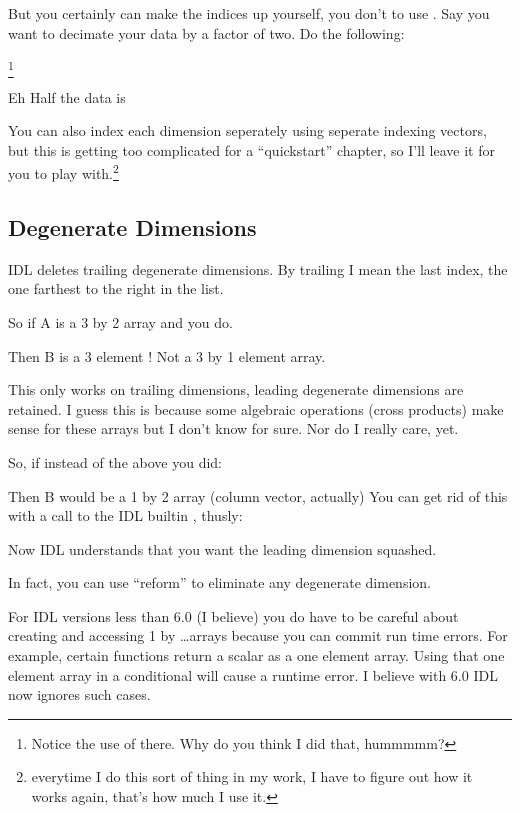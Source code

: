   But you certainly can make the indices up yourself, you don't
   to use . Say you want to decimate your data by a factor of
  two. Do the following:

  \footnote{Notice the use
  of  there. Why do you think I did that, hummmmm?}

  Eh  Half the data is 

  You can also index each dimension seperately using seperate indexing
  vectors, but this is getting too complicated for a ``quickstart''
  chapter, so I'll leave it for you to play with.\footnote{everytime I
  do this sort of thing  in my work, I have to figure out how it works
  again, that's how much I use it.}

\subsection{Degenerate Dimensions}\label{sec:qs-Degenerate-Dimensions}

  IDL deletes trailing degenerate dimensions. By trailing I mean the
  last index, the one farthest to the right in the list.

   So if A is a 3 by 2 array and you do.


  Then B is a 3 element ! Not a 3 by 1 element array.

  This only works on trailing dimensions, leading degenerate
  dimensions are retained. I guess this is because some algebraic
  operations (cross products) make sense for these arrays but I don't
  know for sure. Nor do I really care, yet.

  So, if instead of the above you did:


  Then B would be a 1 by 2 array (column vector, actually) You can get
  rid of this with a call to the IDL builtin , thusly:


  Now IDL understands that you want the leading dimension squashed.

  In fact, you can use ``reform'' to eliminate any degenerate dimension.

  For IDL versions less than 6.0 (I believe) you do have to be careful
  about creating and accessing 1 by \ldots arrays because you can commit
  run time errors. For example, certain functions return a scalar as a
  one element array. Using that one element array in a conditional will
  cause a runtime error. I believe with 6.0 IDL now ignores such cases.

